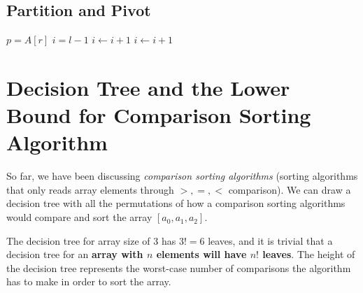 \documentclass{report}
\begin{document}
\subsection{Partition and Pivot}

\noindent \hrulefill
\begin{algorithmic}[0]
   
    \State $p = A[r]$
    \State $i = l - 1$
        \State $i \gets i + 1$
        \State {}
      \EndIf
    \EndFor
    \State $i \gets i + 1$
    \State {}
    \State {}
  \EndFunction
\end{algorithmic}
\noindent \hrulefill

\section[Comparison Sorting Algo Lower Bound]{Decision Tree and the Lower Bound for Comparison Sorting Algorithm }

So far, we have been discussing \textit{comparison sorting algorithms} (sorting algorithms that only reads array elements through $>, =, <$ comparison). We can draw a decision tree with all the permutations of how a comparison sorting algorithms would compare and sort the array $[a_{0}, a_{1}, a_{2}]$.

\begin{center}
\end{center}

The decision tree for array size of 3 has $3! = 6$ leaves, and it is trivial that a decision tree for an \textbf{array with $n$ elements will have $n!$ leaves}. The height of the decision tree represents the worst-case number of comparisons the algorithm has to make in order to sort the array.
\end{document}
